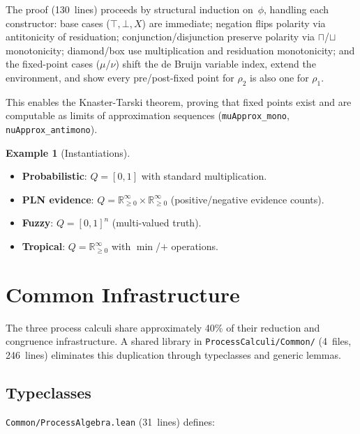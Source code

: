\documentclass[11pt]{article}
\theoremstyle{definition}
\newtheorem{example}[theorem]{Example}
\theoremstyle{remark}
\begin{document}
\noindent
The proof (130~lines) proceeds by structural induction on~$\phi$,
handling each constructor: base cases ($\top, \bot, X$) are immediate;
negation flips polarity via antitonicity of residuation;
conjunction/disjunction preserve polarity via $\sqcap$/$\sqcup$
monotonicity; diamond/box use multiplication and residuation
monotonicity; and the fixed-point cases ($\mu$/$\nu$) shift the de
Bruijn variable index, extend the environment, and show every
pre/post-fixed point for $\rho_2$ is also one for $\rho_1$.

This enables the Knaster-Tarski theorem, proving that fixed points
exist and are computable as limits of approximation sequences
(\texttt{muApprox\_mono}, \texttt{nuApprox\_antimono}).

\begin{example}[Instantiations]
\begin{itemize}[leftmargin=1.5em]
  \item \textbf{Probabilistic}: $Q = [0,1]$ with standard multiplication.
  \item \textbf{PLN evidence}: $Q = \mathbb{R}_{\geq 0}^\infty \times \mathbb{R}_{\geq 0}^\infty$ (positive/negative evidence counts).
  \item \textbf{Fuzzy}: $Q = [0,1]^n$ (multi-valued truth).
  \item \textbf{Tropical}: $Q = \mathbb{R}_{\geq 0}^\infty$ with $\min$/$+$ operations.
\end{itemize}
\end{example}


\section{Common Infrastructure}
\label{sec:common}

The three process calculi share approximately 40\% of their
reduction and congruence infrastructure.  A shared library in
\texttt{ProcessCalculi/Common/} (4~files, 246~lines) eliminates this
duplication through typeclasses and generic lemmas.

\subsection{Typeclasses}

\texttt{Common/ProcessAlgebra.lean} (31~lines) defines:
\end{document}
